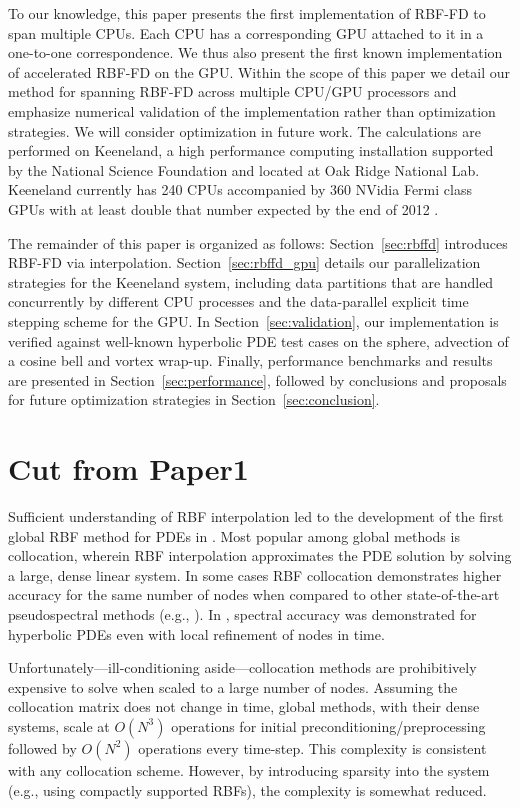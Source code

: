 To our knowledge, this paper presents the first implementation of RBF-FD 
to span multiple CPUs. Each CPU has a corresponding GPU attached to it
in a one-to-one correspondence. We thus also present the first known 
implementation of accelerated RBF-FD on the GPU. Within the scope of this paper we detail our method for spanning RBF-FD across multiple CPU/GPU processors and emphasize numerical validation of the implementation rather than optimization strategies. We will consider optimization in future work. The calculations are performed on Keeneland, a high performance computing installation supported by the National Science Foundation and located at Oak Ridge National Lab. Keeneland currently has 240 CPUs accompanied by 360 NVidia Fermi class GPUs with at least double that number expected by the end of 2012 \cite{Vetter2011}.

The remainder of this paper is organized as follows: Section~\ref{sec:rbffd} introduces RBF-FD via interpolation. Section~\ref{sec:rbffd_gpu} details our parallelization strategies for the Keeneland system, including data partitions that are handled concurrently by different CPU processes and the data-parallel explicit time stepping scheme for the GPU. In Section~\ref{sec:validation}, our implementation is verified against well-known hyperbolic PDE test cases on the sphere, advection of a cosine bell and vortex wrap-up. Finally, performance benchmarks and results are presented in Section~\ref{sec:performance}, followed by conclusions and proposals for future optimization strategies in Section~\ref{sec:conclusion}.

\section{Cut from Paper1}



Sufficient understanding of RBF interpolation led to the development of the first global RBF method for PDEs in \cite{Kansa1990a}. Most popular among global methods is collocation, wherein RBF interpolation approximates the PDE solution by solving a large, dense linear system. 
In some cases RBF collocation demonstrates higher accuracy for the same number of nodes when compared to other state-of-the-art pseudospectral methods (e.g., \cite{Larsson2003} \cite{Flyer2007} \cite{Flyer2009b}). In \cite{Flyer2010}, spectral accuracy was demonstrated for hyperbolic PDEs even with local refinement of nodes in time.


Unfortunately---ill-conditioning aside---collocation methods are prohibitively expensive to solve when scaled to a large number of nodes. Assuming the collocation matrix does not change in time, global methods, with their dense systems, scale at $O(N^3)$ operations for initial preconditioning/preprocessing followed by $O(N^2)$ operations every time-step. This complexity is consistent with any collocation scheme. However, by introducing sparsity into the system (e.g., using compactly supported RBFs), the complexity is somewhat reduced.



